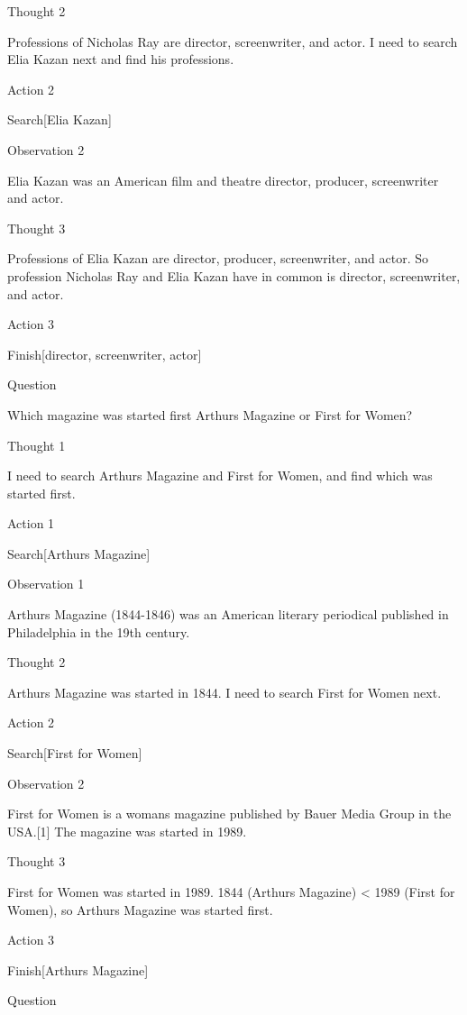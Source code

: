 \documentclass[
]{article}
\begin{document}
Thought 2

Professions of Nicholas Ray are director, screenwriter, and actor. I
need to search Elia Kazan next and find his professions.

Action 2

Search{[}Elia Kazan{]}

Observation 2

Elia Kazan was an American film and theatre director, producer,
screenwriter and actor.

Thought 3

Professions of Elia Kazan are director, producer, screenwriter, and
actor. So profession Nicholas Ray and Elia Kazan have in common is
director, screenwriter, and actor.

Action 3

Finish{[}director, screenwriter, actor{]}

Question

Which magazine was started first Arthur\textquotesingle s Magazine or
First for Women?

Thought 1

I need to search Arthur\textquotesingle s Magazine and First for Women,
and find which was started first.

Action 1

Search{[}Arthur\textquotesingle s Magazine{]}

Observation 1

Arthur\textquotesingle s Magazine (1844-1846) was an American literary
periodical published in Philadelphia in the 19th century.

Thought 2

Arthur\textquotesingle s Magazine was started in 1844. I need to search
First for Women next.

Action 2

Search{[}First for Women{]}

Observation 2

First for Women is a woman\textquotesingle s magazine published by Bauer
Media Group in the USA.{[}1{]} The magazine was started in 1989.

Thought 3

First for Women was started in 1989. 1844 (Arthur\textquotesingle s
Magazine) \textless{} 1989 (First for Women), so
Arthur\textquotesingle s Magazine was started first.

Action 3

Finish{[}Arthur\textquotesingle s Magazine{]}

Question
\end{document}
